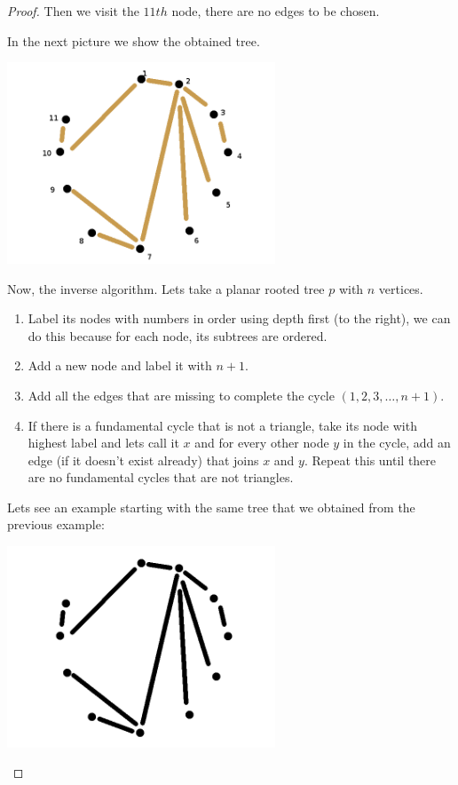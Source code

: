\begin{proof}
    Then we visit the $11th$ node, there are no edges to be chosen.\pn
    
    In the next picture we show the obtained tree. 
    \begin{center}
        \includegraphics[width=8cm]{Homework1/Problem4/TriangulationToPlanarRootedTree8.png}
    \end{center}
    
    Now, the inverse algorithm. Lets take a planar rooted tree $p$ with $n$ vertices. 
    \begin{enumerate}
        \item 
            Label its nodes with numbers in order using depth first (to the right), we can do
            this because for each node, its subtrees are ordered.
        \item
            Add a new node and label it with $n+1$.
        \item
            Add all the edges that are missing to complete the cycle $(1, 2, 3, \dots, n+1)$.
        \item
            If there is a fundamental cycle that is not a triangle, take its node with highest label and lets call it $x$ and
            for every other node $y$ in the cycle, add an edge (if it doesn't exist already) that joins $x$ and $y$. Repeat this
            until there are no fundamental cycles that are not triangles.
    \end{enumerate}
    
    Lets see an example starting with the same tree that we obtained from the previous example:
    \begin{center}
        \includegraphics[width=8cm]{Homework1/Problem4/PlanarRootedTreeToTriangulation1.png}
    \end{center}
    

\end{proof}
